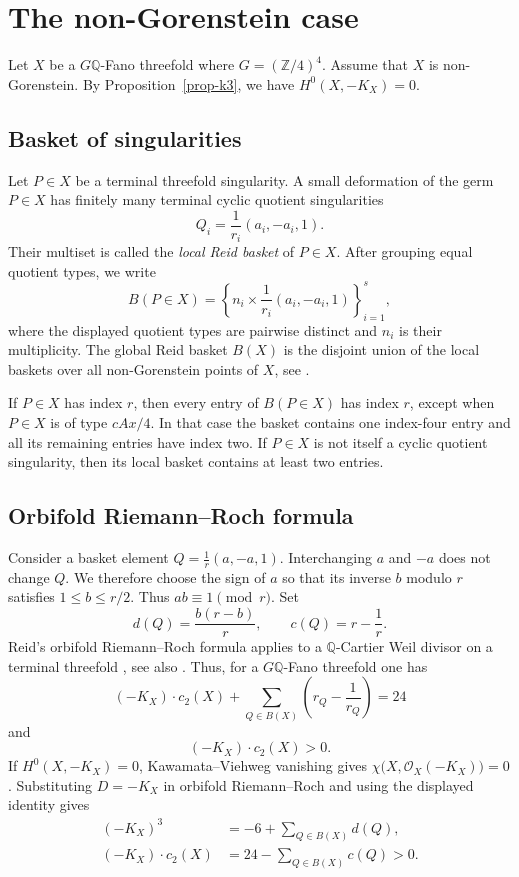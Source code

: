 \documentclass[10pt,oneside,reqno]{amsart}
\numberwithin{equation}{section}
\theoremstyle{definition}
\newcommand{\Q}{\mathbb Q}
\begin{document}
\section{The non-Gorenstein case}
\label{sec-nongorenstein}
Let $X$ be a $G\mathbb{Q}$-Fano threefold where $G=(\mathbb{Z}/4)^4$. 
Assume that $X$ is non-Gorenstein.  By Proposition~\ref{prop-k3}, we have
$
 H^0(X,-K_X)=0.
$

\subsection{Basket of singularities}
\label{sec-about-baskets}
Let $P\in X$ be a terminal threefold singularity.  A small deformation
of the germ $P\in X$ has finitely many terminal cyclic quotient
singularities
\[
 Q_i=\frac1{r_i}(a_i,-a_i,1).
\]
Their multiset is called the \emph{local Reid basket} of $P\in X$.
After grouping equal quotient types, we write
\begin{equation}
 B(P\in X)=
 \left\{n_i\times\frac1{r_i}(a_i,-a_i,1)\right\}_{i=1}^s,
 \label{eq-local-basket}
\end{equation}
where the displayed quotient types are pairwise distinct and $n_i$ is
their multiplicity.
The global Reid basket $B(X)$ is the disjoint union of the local
baskets over all non-Gorenstein points of $X$, see
\cite[Section~6]{Reid}.

If $P\in X$ has index $r$, then every entry of $B(P\in X)$ has index
$r$, except when $P\in X$ is of type $cAx/4$.  In that case the basket
contains one index-four entry and all its remaining entries have index
two.  If $P\in X$ is not itself a cyclic quotient singularity, then
its local basket contains at least two entries.


\subsection{Orbifold Riemann--Roch formula}
Consider a basket element
$
 Q=\frac1r(a,-a,1).
$
Interchanging $a$ and $-a$ does not change $Q$.  We therefore choose
the sign of $a$ so that its inverse $b$ modulo $r$ satisfies
$1\leq b\leq r/2$. Thus $ab\equiv1\pmod r$.  Set
\[
 d(Q)=\frac{b(r-b)}r,
 \qquad c(Q)=r-\frac1r.
\]
Reid's orbifold Riemann--Roch formula applies to a $\Q$-Cartier Weil
divisor on a terminal threefold \cite[Section~10.2]{Reid}, see also
\cite[Theorem~12.1.3]{ProkhorovEMMP}.  
Thus, for a $G\Q$-Fano threefold one has
\[
 (-K_X)\cdot c_2(X)+
 \sum_{Q\in B(X)}\left(r_Q-\frac1{r_Q}\right)=24
\]
and
\[
 (-K_X)\cdot c_2(X)>0.
\]
If $H^0(X,-K_X)=0$, Kawamata--Viehweg vanishing gives
$\chi\bigl(X,\mathcal O_X(-K_X)\bigr)=0$.  Substituting $D=-K_X$ in orbifold
Riemann--Roch and using the displayed identity gives
\begin{align}
 (-K_X)^3&=-6+\sum_{Q\in B(X)}d(Q),
 \label{eq-orr-volume}\\
 (-K_X)\cdot c_2(X)&=
 24-\sum_{Q\in B(X)}c(Q)>0.
 \label{eq-orr-c2}
\end{align}
\end{document}
